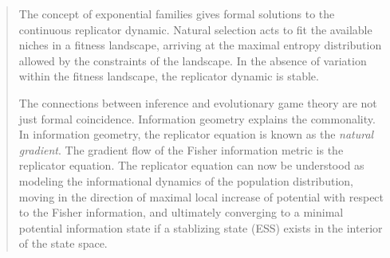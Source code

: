 \documentclass[a4paper,10pt]{article}
\begin{document}
\begin{quotation}
    The concept of exponential families gives formal solutions
    to the continuous replicator dynamic.
    Natural selection acts to fit the available niches in a fitness landscape, arriving at the maximal entropy distribution allowed by the constraints of the landscape. In the absence of variation within the fitness landscape, the replicator dynamic is stable.
    
    The connections between inference and evolutionary game theory are not just formal coincidence.
    Information geometry explains the commonality.
    In information geometry, the replicator equation is known as the \emph{natural gradient}.
    The gradient flow of the Fisher information metric is the replicator equation.
    The replicator equation can now be understood as modeling the informational dynamics of the population distribution, moving in the direction of maximal local increase of potential with respect to the Fisher information, and ultimately converging to a minimal potential information state if a stablizing state (ESS) exists in the interior of the state space.
    
\end{quotation}

\\
\end{document}

